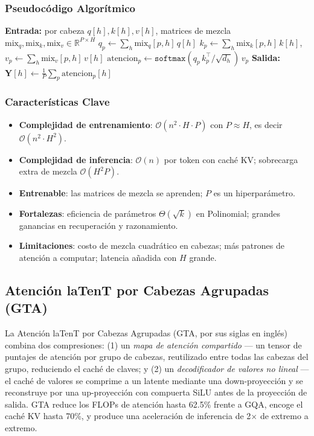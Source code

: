 \subsubsection{Pseudocódigo Algorítmico}
\begin{algorithmic}[1]
\State \textbf{Entrada:} por cabeza $q[h], k[h], v[h]$, matrices de mezcla $\text{mix}_q, \text{mix}_k, \text{mix}_v \in \mathbb{R}^{P \times H}$
    \State $q_p \gets \sum_h \text{mix}_q[p,h]\, q[h]$ 
    \State $k_p \gets \sum_h \text{mix}_k[p,h]\, k[h]$, \quad $v_p \gets \sum_h \text{mix}_v[p,h]\, v[h]$
    \State $\text{atencion}_p \gets \texttt{softmax}(q_p\, k_p^\top / \sqrt{d_h})\, v_p$
\EndFor
\State \textbf{Salida:} $\mathbf{Y}[h] \gets \frac{1}{P} \sum_p \text{atencion}_p[h]$ 
\end{algorithmic}

\subsubsection{Características Clave}
\begin{itemize}[leftmargin=*]
    \item \textbf{Complejidad de entrenamiento}: $\mathcal{O}(n^2 \cdot H \cdot P)$ con $P \approx H$, es decir $\mathcal{O}(n^2 \cdot H^2)$.
    \item \textbf{Complejidad de inferencia}: $\mathcal{O}(n)$ por token con caché KV; sobrecarga extra de mezcla $\mathcal{O}(H^2 P)$.
    \item \textbf{Entrenable}: las matrices de mezcla se aprenden; $P$ es un hiperparámetro.
    \item \textbf{Fortalezas}: eficiencia de parámetros $\Theta(\sqrt{k})$ en Polinomial; grandes ganancias en recuperación y razonamiento.
    \item \textbf{Limitaciones}: costo de mezcla cuadrático en cabezas; más patrones de atención a computar; latencia añadida con $H$ grande.
\end{itemize}

\subsection{Atención laTenT por Cabezas Agrupadas (GTA)}
La Atención laTenT por Cabezas Agrupadas (GTA, por sus siglas en inglés) \citep{sun_gta_2025} combina dos compresiones: (1) un \emph{mapa de atención compartido} --- un tensor de puntajes de atención por grupo de cabezas, reutilizado entre todas las cabezas del grupo, reduciendo el caché de claves; y (2) un \emph{decodificador de valores no lineal} --- el caché de valores se comprime a un latente mediante una down-proyección y se reconstruye por una up-proyección con compuerta SiLU antes de la proyección de salida. GTA reduce los FLOPs de atención hasta 62.5\% frente a GQA, encoge el caché KV hasta 70\%, y produce una aceleración de inferencia de 2$\times$ de extremo a extremo.

